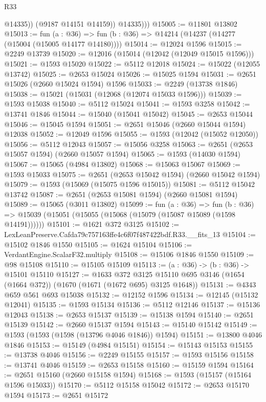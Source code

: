 \begin{lexlean}{R33}
\begin{coremodule}
                @14335))
            (@9187 @14151 @14159))
          @14335)))
@15005 := @11801 @13802
@15013 := fun (a : @36) => fun (b : @36) => @14214 (@14237 (@14277 (@15004 (@15005 @14177 @14180))))
@15014 := @12024 @1596
@15015 := @2249 @13739
@15020 := @12016 (@15014 (@12042 (@12049 @15015 @1596)))
@15021 := @1593 @15020
@15022 := @5112 @12018
@15024 := @15022 (@12055 @13742)
@15025 := @2653 @15024
@15026 := @15025 @1594
@15031 := @2651 @15026 (@2660 @15024 @1594) @1596
@15033 := @2249 (@13738 @1846)
@15038 := @15021 (@15031 (@12068 (@12074 @15033 @1596)))
@15039 := @1593 @15038
@15040 := @5112 @15024
@15041 := @1593 @3258
@15042 := @13741 @1846
@15044 := @15040 (@15041 @15042)
@15045 := @2653 @15044
@15046 := @15045 @1594
@15051 := @2651 @15046 (@2660 @15044 @1594) @12038
@15052 := @12049 @1596
@15055 := @1593 (@12042 (@15052 @12050))
@15056 := @5112 @12043
@15057 := @15056 @3258
@15063 := @2651 (@2653 @15057 @1594) (@2660 @15057 @1594)
@15065 := @1593 (@14030 @1594)
@15067 := @15065 (@4984 @13802)
@15068 := @15063 @15067
@15069 := @1593 @15033
@15075 := @2651 (@2653 @15042 @1594) (@2660 @15042 @1594)
@15079 := @1593 (@15069 (@15075 @1596 @15015))
@15081 := @5112 @15042 @13742
@15087 := @2651 (@2653 @15081 @1594) (@2660 @15081 @1594)
@15089 := @15065 (@3011 @13802)
@15099 := fun (a : @36) =>
  fun (b : @36) => @15039 (@15051 (@15055 (@15068 (@15079 (@15087 @15089 (@1598 @14191))))))
@15101 := @1621 @372 @3125
@15102 := LexLeanPreserve.Cafda79c757163ffe4c6f07f487422bdf.R33.__fits_13
@15104 := @15102 @1846 @1550
@15105 := @1624 @15104
@15106 := VerdantEngine.ScalarF32.multiply
@15108 := @15106 @1846 @1550
@15109 := @98 @15108
@15110 := @15105 @15109
@15113 := (a : @36) -> (b : @36) -> @15101 @15110
@15127 := @1633
    @372
    @3125
    @15110
    @695
    @3146
    (@1654 (@1664 @372))
    (@1670 (@1671 (@1672 @695) @3125 @1648))
@15131 := @4343 @659 @561 @693 @15038
@15132 := @12152 @1596
@15134 := @12145 (@15132 @12041)
@15135 := @1593 @15134
@15136 := @5112 @12146
@15137 := @15136 @12043
@15138 := @2653 @15137
@15139 := @15138 @1594
@15140 := @2651 @15139
@15142 := @2660 @15137 @1594
@15143 := @15140 @15142
@15149 := @1593 (@1593 (@1598 (@13796 @4046 @1846)) @1594)
@15151 := @13800 @4046 @1846
@15153 := @15149 (@4984 @15151)
@15154 := @15143 @15153
@15155 := @13738 @4046
@15156 := @2249 @15155
@15157 := @1593 @15156
@15158 := @13741 @4046
@15159 := @2653 @15158
@15160 := @15159 @1594
@15164 := @2651 @15160 (@2660 @15158 @1594)
@15168 := @1593 (@15157 (@15164 @1596 @15033))
@15170 := @5112 @15158 @15042
@15172 := @2653 @15170 @1594
@15173 := @2651 @15172

\end{coremodule}
\end{lexlean}
